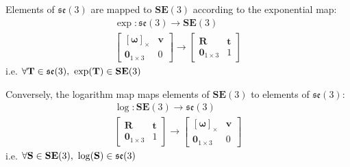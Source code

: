 		Elements of $\mathfrak{se}(3)$ are mapped to $\textbf{SE}(3)$ according to the exponential map:
			\begin{equation}
				\begin{split}
					\exp: \mathfrak{se}(3) \rightarrow \mathbf{SE}(3)\\
					\begin{bmatrix}
						  [\mathbf{\omega}]_\times	&  \mathbf{v}\\
						  \textbf{0}_{1 \times 3} & 0						  
					\end{bmatrix}
					\rightarrow 
					\begin{bmatrix}
						  \mathbf{R}	&	\mathbf{t} \\
						  \textbf{0}_{1 \times 3}		& 	1 
					\end{bmatrix}
				\end{split}		
			\end{equation}		
			i.e. $\forall \mathbf{T} \in \mathfrak{se}(3) \textnormal{, } \exp(\mathbf{T}) \in  \mathbf{SE}(3)$
			
			Conversely, the logarithm map maps elements of $\mathbf{SE}(3)$ to elements of $\mathfrak{se}(3)$:
			\begin{equation}
				\begin{split}
					\log: \mathbf{SE}(3) \rightarrow \mathfrak{se}(3)\\
					\begin{bmatrix}
						\mathbf{R}	&	\mathbf{t} \\
						\textbf{0}_{1 \times 3}		& 	1 					 				  
					\end{bmatrix}
					\rightarrow 
					\begin{bmatrix}
					 	[\mathbf{\omega}]_\times	&  \mathbf{v}\\
					 	\textbf{0}_{1 \times 3} & 0			
					\end{bmatrix}
				\end{split}		
			\end{equation}		
			i.e. $\forall \mathbf{S} \in \mathbf{SE}(3)  \textnormal{, } \log(\mathbf{S}) \in  \mathfrak{se}(3)$
		
